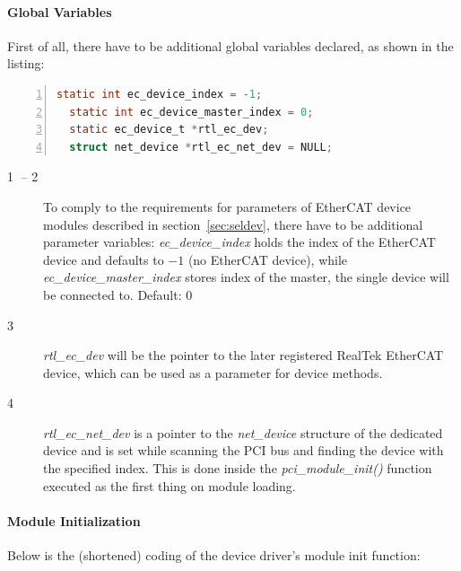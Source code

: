 \documentclass[a4paper,12pt,BCOR6mm,bibtotoc,idxtotoc]{scrbook}
\begin{document}
\paragraph{Global Variables}

First of all, there have to be additional global variables declared,
as shown in the listing:

\begin{lstlisting}[language=C,numbers=left]
  static int ec_device_index = -1;
  static int ec_device_master_index = 0;
  static ec_device_t *rtl_ec_dev;
  struct net_device *rtl_ec_net_dev = NULL;
\end{lstlisting}

\begin{description}
\item[\normalfont\textcircled{\tiny 1} -- \textcircled{\tiny 2}] To
  comply to the requirements for parameters of EtherCAT device modules
  described in section~\ref{sec:seldev}, there have to be additional
  parameter variables: \textit{ec\_\-device\_\-index} holds the index
  of the EtherCAT device and defaults to $-1$ (no EtherCAT device),
  while \textit{ec\_device\_master\_index} stores index of the master,
  the single device will be connected to. Default: $0$
\item[\normalfont\textcircled{\tiny 3}] \textit{rtl\_ec\_dev} will be
  the pointer to the later registered RealTek EtherCAT device, which
  can be used as a parameter for device methods.
\item[\normalfont\textcircled{\tiny 4}] \textit{rtl\_ec\_net\_dev} is
  a pointer to the \textit{net\_device} structure of the dedicated
  device and is set while scanning the PCI bus and finding the device
  with the specified index. This is done inside the
  \textit{pci\_module\_init()} function executed as the first thing on
  module loading.
\end{description}

\paragraph{Module Initialization}

Below is the (shortened) coding of the device driver's module init
function:
\end{document}
